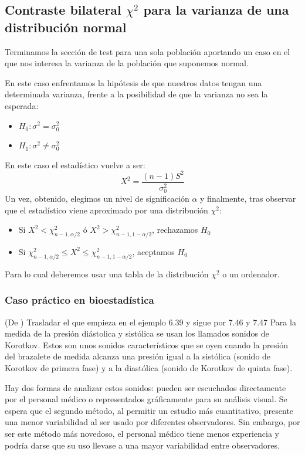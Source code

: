 \documentclass[a4paper,12pt]{article}
\begin{document}
\subsection{Contraste bilateral $\chi^2$ para la varianza de una distribución normal}

Terminamos la sección de test para una sola población aportando un caso en el que nos interesa la varianza de la población que suponemos normal.

En este caso enfrentamos la hipótesis de que nuestros datos tengan una determinada varianza, frente a la posibilidad  de que la varianza no sea la esperada: 
\begin{itemize}
	\item $H_0:\sigma^2=\sigma^2_0$
	\item $H_1: \sigma^2\neq\sigma^2_0$
\end{itemize}

En este caso el estadístico vuelve a ser: 
$$X^2=\frac{(n-1)S^2}{\sigma_0^2}$$
Un vez, obtenido, elegimos un nivel de significación $\alpha$ y finalmente, tras observar que el estadístico viene aproximado por una distribución $\chi^2$:
\begin{itemize}
	\item Si $X^2<\chi^2_{n-1,\alpha/2}$ ó $X^2>\chi^2_{n-1,1-\alpha/2}$, rechazamos $H_0$
	\item Si $\chi^2_{n-1,\alpha/2}\leq X^2\leq\chi^2_{n-1,1-\alpha/2}$, aceptamos $H_0$
\end{itemize}
Para lo cual deberemos usar una tabla de la distribución $\chi^2$ o un ordenador.

\subsubsection*{Caso práctico en bioestadística}
(De \cite{rosner2015fundamentals}) Trasladar el que empieza en el ejemplo 6.39 y sigue por 7.46 y 7.47
    Para la medida de la presión diástolica y sistólica se usan los llamados sonidos de Korotkov. 
    Estos son unos sonidos característicos que se oyen cuando la presión del brazalete de medida alcanza una presión igual a la sistólica (sonido de Korotkov de primera fase) y a la diastólica (sonido de Korotkov de quinta fase).

    Hay dos formas de analizar estos sonidos: pueden ser escuchados directamente por el personal médico o representados gráficamente para su análisis visual.
    Se espera que el segundo método, al permitir un estudio más cuantitativo, presente una menor variabilidad al ser usado por diferentes observadores.
    Sin embargo, por ser este método más novedoso, el personal médico tiene menos experiencia y podría darse que su uso llevase a una mayor variabilidad entre observadores.
\end{document}
